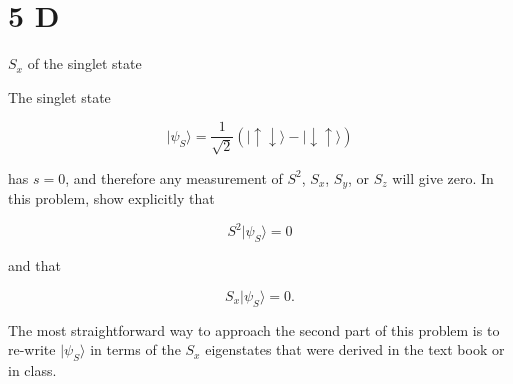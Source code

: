 \documentclass{article}
\begin{document}
\section*{5 D}
\begin{ques}\label{q5}
\( S_x \) of the singlet state

The singlet state

\[
|\psi_S\rangle = \frac{1}{\sqrt{2}} \left( |\uparrow\downarrow\rangle - |\downarrow\uparrow\rangle \right)
\]

has \( s = 0 \), and therefore any measurement of \( S^2 \), \( S_x \), \( S_y \), or \( S_z \) will give zero. In this problem, show explicitly that

\[
S^2 |\psi_S\rangle = 0
\]

and that

\[
S_x |\psi_S\rangle = 0 .
\]

The most straightforward way to approach the second part of this problem is to re-write \( |\psi_S\rangle \) in terms of the \( S_x \) eigenstates that were derived in the text book or in class.
\end{ques}
\end{document}
